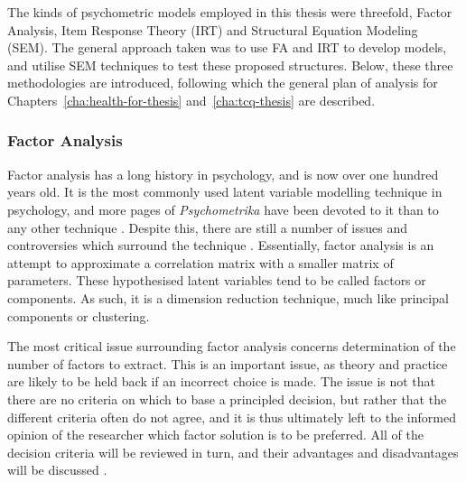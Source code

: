 The kinds of psychometric models employed in this thesis were threefold, Factor Analysis, Item Response Theory (IRT) and Structural Equation Modeling (SEM). The general approach taken was to use FA and IRT to develop models, and utilise SEM techniques to test these proposed structures. Below, these three methodologies are introduced, following which the general plan of analysis for Chapters~\ref{cha:health-for-thesis} and~\ref{cha:tcq-thesis} are described. 

\subsubsection{Factor Analysis}
\label{sec:factor-analysis}
Factor analysis has a long history in psychology, and is now over one hundred years old. It is the most commonly used latent variable modelling technique in psychology, and more pages of \textit{Psychometrika} have been devoted to it than to any other technique \cite{henson2006use}.  Despite this, there are still a number of issues and controversies which surround the technique \cite{sass2010comparative}.  Essentially, factor analysis is an attempt to approximate a correlation matrix with a smaller matrix of parameters.  These hypothesised latent variables tend to be called factors or components. As such, it is a dimension reduction technique, much like principal components or clustering. 



The most critical issue surrounding factor analysis concerns determination of the number of factors to extract\cite{zwick1986comparison}.  This is an important issue, as theory and practice are likely to be held back if an incorrect choice is made.  The issue is not that there are no criteria on which to base a principled decision, but rather that the different criteria often do not agree, and it is thus ultimately left to the informed opinion of the researcher which factor solution is to be preferred.  All of the decision criteria will be reviewed in turn, and their advantages and disadvantages will be discussed \cite{henson2006use}. 

